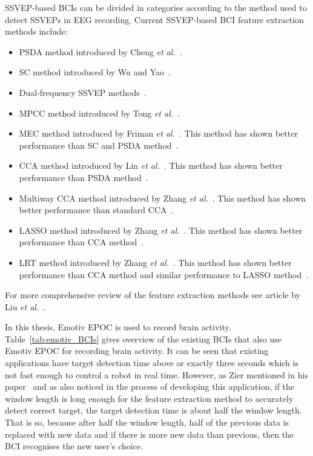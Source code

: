 \gls{SSVEP}-based \glspl{BCI} can be divided in categories according to the method used to detect \glspl{SSVEP} in \gls{EEG} recording. Current \gls{SSVEP}-based \gls{BCI} \gls{feature extraction} methods include:
\begin{itemize}
	\item \Gls{PSDA} method introduced by Cheng \textit{et al.}~\cite{psda}.
	\item \Gls{SC} method introduced by Wu and Yao~\cite{sc}.
	\item Dual-frequency \gls{SSVEP} methods~\cite{dual1, dual2}.
	\item \Gls{MPCC} method introduced by Tong \textit{et al.}~\cite{MPCC}.
	\item \Gls{MEC} method introduced by Friman \textit{et al.}~\cite{mec}. This method has shown better performance than \gls{SC} and \gls{PSDA} method~\cite{mec_comparison}.
	\item \Gls{CCA} method introduced by Lin \textit{et al.}~\cite{cca_lin}. This method has shown better performance than \gls{PSDA} method~\cite{cca_psda, bin2009cca, cca_lin}.
	\item Multiway \gls{CCA} method introduced by Zhang \textit{et al.}~\cite{mcca}. This method has shown better performance than standard \gls{CCA}~\cite{mcca}.
	\item \Gls{LASSO} method introduced by Zhang \textit{et al.}~\cite{LASSO}. This method has shown better performance than \gls{CCA} method~\cite{LASSO}.
	\item \Gls{LRT} method introduced by Zhang \textit{et al.}~\cite{LRT}. This method has shown better performance than \gls{CCA} method and similar performance to \gls{LASSO} method~\cite{LRT}.
\end{itemize}
For more comprehensive review of the \gls{feature extraction} methods see article by Liu \textit{et al.}~\cite{feature_extraction}.

In this thesis, Emotiv EPOC is used to record brain activity. Table~\ref{tab:emotiv_BCIs} gives overview of the existing \glspl{BCI} that also use Emotiv EPOC for recording brain activity. It can be seen that existing applications have \gls{target} detection time above or exactly three seconds which is not fast enough to control a robot in real time. However, as Zier mentioned in his paper~\cite{emotiv_psda} and as also noticed in the process of developing this application, if the \gls{window} length is long enough for the \gls{feature extraction} method to accurately detect correct \gls{target}, the \gls{target} detection time is about half the \gls{window} length. That is so, because after half the \gls{window} length, half of the previous data is replaced with new data and if there is more new data than previous, then the \gls{BCI} recognises the new user's choice.

